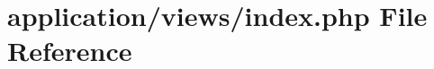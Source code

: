 \hypertarget{application_2views_2index_8php}{}\section{application/views/index.php File Reference}
\label{application_2views_2index_8php}
